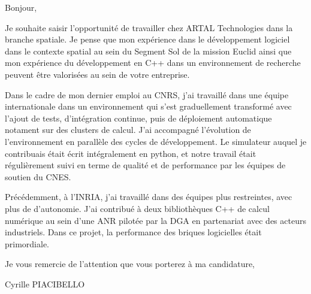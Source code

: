 \documentclass{article}
\begin{document}
Bonjour,

Je souhaite saisir l'opportunité de travailler chez ARTAL Technologies
dans la branche spatiale. Je pense que mon expérience dans le
développement logiciel dans le contexte spatial au sein du Segment Sol
de la mission Euclid ainsi que mon expérience du développement en C++
dans un environnement de recherche peuvent être valorisées au sein de
votre entreprise.

Dans le cadre de mon dernier emploi au CNRS, j'ai travaillé dans une
équipe internationale dans un environnement qui s'est graduellement
transformé avec l'ajout de tests, d'intégration continue, puis de
déploiement automatique notament sur des clusters de calcul. J'ai
accompagné l'évolution de l'environnement en parallèle des cycles de
développement. Le simulateur auquel je contribuais était écrit
intégralement en python, et notre travail était régulièrement suivi en
terme de qualité et de performance par les équipes de soutien du CNES.

Précédemment, à l'INRIA, j'ai travaillé dans des équipes plus
restreintes, avec plus de d'autonomie. J'ai contribué à deux
bibliothèques C++ de calcul numérique au sein d'une ANR pilotée par la
DGA en partenariat avec des acteurs industriels. Dans ce projet, la
performance des briques logicielles était primordiale.



\bigskip %

Je vous remercie de l'attention que vous porterez à ma candidature,

\vspace{50pt} %

Cyrille PIACIBELLO
\end{document}
